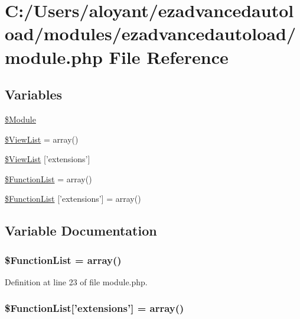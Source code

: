 \hypertarget{module_8php}{\section{C\-:/\-Users/aloyant/ezadvancedautoload/modules/ezadvancedautoload/module.php File Reference}
\label{module_8php}
}
\subsection*{Variables}
\begin{DoxyCompactItemize}
\item 
\hyperlink{module_8php_a643d60fb839b5d58f0725a88d0ecd1a0}{\$\-Module}
\item 
\hyperlink{module_8php_a8e0c26fc38651904852a8f967a548fa2}{\$\-View\-List} = array()
\item 
\hyperlink{module_8php_a0cfec2359ce3a2faffb2a415c2bcbd21}{\$\-View\-List} \mbox{[}'extensions'\mbox{]}
\item 
\hyperlink{module_8php_a81d0c7ad3471ab93425a3cdf655a9c95}{\$\-Function\-List} = array()
\item 
\hyperlink{module_8php_a4ebda8699e3f12057fdaf4e8639a45f8}{\$\-Function\-List} \mbox{[}'extensions'\mbox{]} = array()
\end{DoxyCompactItemize}


\subsection{Variable Documentation}
\hypertarget{module_8php_a81d0c7ad3471ab93425a3cdf655a9c95}{
\subsubsection[{\$\-Function\-List}]{\setlength{\rightskip}{0pt plus 5cm}\$Function\-List = array()}}\label{module_8php_a81d0c7ad3471ab93425a3cdf655a9c95}


Definition at line 23 of file module.\-php.

\hypertarget{module_8php_a4ebda8699e3f12057fdaf4e8639a45f8}{
\subsubsection[{\$\-Function\-List}]{\setlength{\rightskip}{0pt plus 5cm}\$Function\-List\mbox{[}'extensions'\mbox{]} = array()}}\label{module_8php_a4ebda8699e3f12057fdaf4e8639a45f8}


